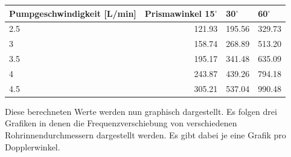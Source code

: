 \documentclass[titlepage=firstcover, captions=tableheading]{scrartcl}
\begin{document}
        \begin{minipage}{\linewidth}
            \begin{table}[H]
                \centering
            
            \begin{tabular}{lrll}
                \toprule
                Pumpgeschwindigkeit [L/min] & Prismawinkel 15$^{\circ}$ & 30$^{\circ}$ & 60$^{\circ}$ \\
                \midrule
                2.5   & 121.93 & 195.56 & 329.73 \\ 
                3     & 158.74 & 268.89 & 513.20  \\ 
                3.5   & 195.17 & 341.48 & 635.09 \\ 
                4     & 243.87 & 439.26 & 794.18  \\
                4.5   & 305.21 & 537.04 & 990.48  \\    
                \bottomrule
                
            \end{tabular}
            \label{tab:6}
            \end{table}
            \end{minipage}

\noindent Diese berechneten Werte werden nun graphisch dargestellt. Es folgen drei Grafiken in denen die Frequenzverschiebung von verschiedenen Rohrinnendurchmessern dargestellt werden. Es gibt dabei je eine Grafik pro Dopplerwinkel.
\end{document}
